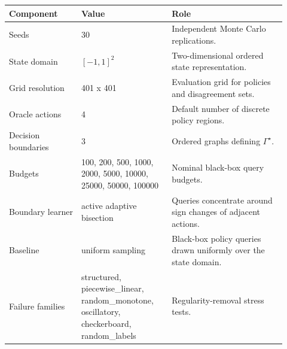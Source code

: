 \begin{tabular}{p{0.24\linewidth}p{0.30\linewidth}p{0.38\linewidth}}
\toprule
Component & Value & Role \\
\midrule
Seeds & 30 & Independent Monte Carlo replications. \\
State domain & $[-1,1]^2$ & Two-dimensional ordered state representation. \\
Grid resolution & 401 x 401 & Evaluation grid for policies and disagreement sets. \\
Oracle actions & 4 & Default number of discrete policy regions. \\
Decision boundaries & 3 & Ordered graphs defining $\Gamma^\star$. \\
Budgets & 100, 200, 500, 1000, 2000, 5000, 10000, 25000, 50000, 100000 & Nominal black-box query budgets. \\
Boundary learner & active adaptive bisection & Queries concentrate around sign changes of adjacent actions. \\
Baseline & uniform sampling & Black-box policy queries drawn uniformly over the state domain. \\
Failure families & structured, piecewise_linear, random_monotone, oscillatory, checkerboard, random_labels & Regularity-removal stress tests. \\
\bottomrule
\end{tabular}

